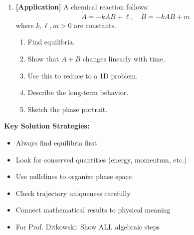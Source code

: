 \documentclass[12pt]{article}
\begin{document}
\begin{enumerate}[resume]
\item \textbf{[Application]} A chemical reaction follows:
$$\dot{A} = -kAB + \ell, \quad \dot{B} = -kAB + m$$
where $k, \ell, m > 0$ are constants.
\begin{enumerate}[label=(\alph*)]
    \item Find equilibria.
    \item Show that $A + B$ changes linearly with time.
    \item Use this to reduce to a 1D problem.
    \item Describe the long-term behavior.
    \item Sketch the phase portrait.
\end{enumerate}
\end{enumerate}

\begin{hint}
\textbf{Key Solution Strategies:}
\begin{itemize}
    \item Always find equilibria first
    \item Look for conserved quantities (energy, momentum, etc.)
    \item Use nullclines to organize phase space
    \item Check trajectory uniqueness carefully
    \item Connect mathematical results to physical meaning
    \item For Prof. Ditkowski: Show ALL algebraic steps
\end{itemize}
\end{hint}
\end{document}
